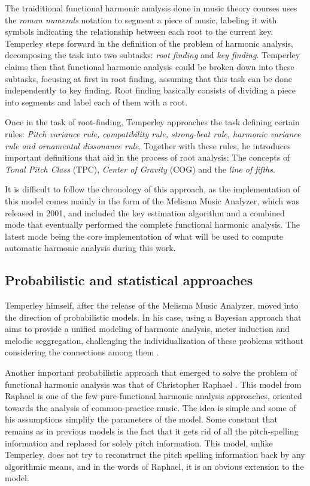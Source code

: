     The traiditional functional harmonic analysis done in
    music theory courses uses the \emph{roman numerals}
    notation to segment a piece of music, labeling it with
    symbols indicating the relationship between each root to
    the current key. Temperley steps forward in the
    definition of the problem of harmonic analysis,
    decomposing the task into two subtasks: \emph{root
    finding} and \emph{key finding}. Temperley claims then
    that functional harmonic analysis could be broken down
    into these subtasks, focusing at first in root finding,
    assuming that this task can be done independently to key
    finding. Root finding basically consists of dividing a
    piece into segments and label each of them with a root.

Once in the task of root-finding, Temperley approaches the
task defining certain rules: \emph{Pitch variance rule,
compatibility rule, strong-beat rule, harmonic variance rule
and ornamental dissonance rule}. Together with these rules,
he introduces important definitions that aid in the process
of root analysis: The concepts of \emph{Tonal Pitch Class}
(TPC), \emph{Center of Gravity} (COG) and the \emph{line of
fifths}.

It is difficult to follow the chronology of this approach,
as the implementation of this model comes mainly in the form
of the Melisma Music Analyzer, which was released in 2001,
and included the key estimation algorithm and a combined
mode that eventually performed the complete functional
harmonic analysis. The latest mode being the core
implementation of what will be used to compute automatic
harmonic analysis during this work.



\subsection{Probabilistic and statistical approaches}
Temperley himself, after the release of the Melisma Music
Analyzer, moved into the direction of probabilistic models.
In his case, using a Bayesian approach that aims to provide
a unified modeling of harmonic analysis, meter induction and
melodic seggregation, challenging the individualization of
these problems without considering the connections among
them \cite{temperley2009unified}.

Another important probabilistic approach that emerged to
solve the problem of functional harmonic analysis was that
of Christopher Raphael \cite{raphael2003harmonic}. This
model from Raphael is one of the few pure-functional
harmonic analysis approaches, oriented towards the analysis
of common-practice music. The idea is simple and some of his
assumptions simplify the parameters of the model. Some
constant that remains as in previous models is the fact that
it gets rid of all the pitch-spelling information and
replaced for solely pitch information. This model, unlike
Temperley, does not try to reconstruct the pitch spelling
information back by any algorithmic means, and in the words
of Raphael, it is an obvious extension to the model.

